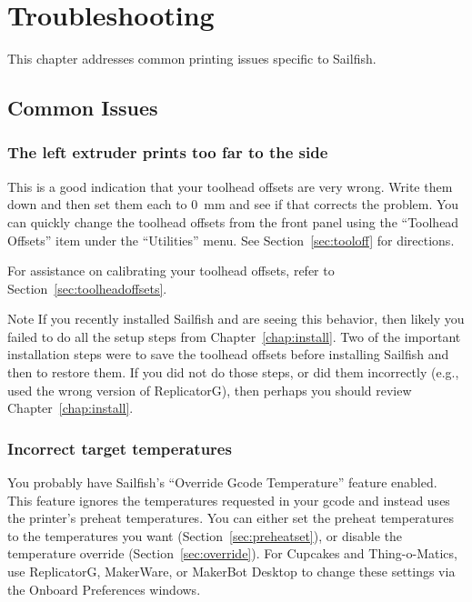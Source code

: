 

\chapter{Troubleshooting}

This chapter addresses common printing issues specific to Sailfish.


\section{Common Issues}

\subsection{The left extruder prints too far to the side}

This is a good indication that your toolhead offsets are very wrong.
Write them down and then set them each to 0~mm and see if that
corrects the problem.  You can quickly change the toolhead offsets
from the front panel using the ``Toolhead Offsets'' item under the
``Utilities'' menu.  See Section~\ref{sec:tooloff} for directions.

For assistance on calibrating your toolhead offsets, refer to
Section~\ref{sec:toolheadoffsets}.

\begin{bclogo}[logo=\bcinfo, noborder=true, couleurBarre=yellow]{Note}
If you recently installed Sailfish and are seeing this behavior, then likely
you failed to do all the setup steps from Chapter~\ref{chap:install}.  Two
of the important installation steps were to save the toolhead offsets before
installing Sailfish and then to restore them.  If you did not do those
steps, or did them incorrectly (e.g., used the wrong version of ReplicatorG),
then perhaps you should review Chapter~\ref{chap:install}.
\end{bclogo}

\subsection{Incorrect target temperatures}

You probably have Sailfish's ``Override Gcode Temperature'' feature
enabled. This feature ignores the temperatures requested in your gcode and
instead uses the printer's preheat temperatures. You can either set the preheat
temperatures to the temperatures you want
(Section~\ref{sec:preheatset}), or disable the temperature override
(Section~\ref{sec:override}).  For Cupcakes and Thing-o-Matics, use
ReplicatorG, MakerWare, or MakerBot Desktop to change these settings
via the Onboard Preferences windows.

